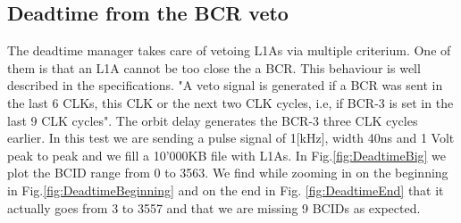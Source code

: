 \subsection{Deadtime from the BCR veto}


The deadtime manager takes care of vetoing L1As via multiple criterium. One of them is that an L1A cannot be too close the a BCR. This behaviour is well described in the specifications. "A veto signal is generated if a BCR was sent in the last 6 CLKs, this CLK or the next two CLK cycles, i.e, if BCR-3 is set in the last 9 CLK cycles". The orbit delay generates the BCR-3 three CLK cycles earlier. In this test we are sending a pulse signal of 1[kHz], width 40ns and 1 Volt peak to peak and we fill a 10'000KB file with L1As. In Fig.\ref{fig:DeadtimeBig} we plot the BCID range from 0 to 3563. We find while zooming in on the beginning in Fig.\ref{fig:DeadtimeBeginning} and on the end in Fig. \ref{fig:DeadtimeEnd} that it actually goes from 3 to 3557 and that we are missing 9 BCIDs as expected.


